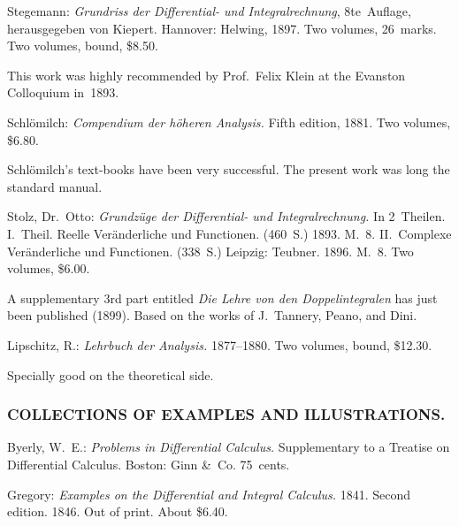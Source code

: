 \documentclass[12pt]{book}[2005/09/16]
\newlength{\ParIndent}
\newenvironment{Book}{\medskip\par\noindent\hangindent\ParIndent\ignorespaces}{\par}
\newenvironment{Descrip}{%
  \begin{list}{}{%
      \setlength{\leftmargin}{1.5\ParIndent}%
      \setlength{\itemindent}{\ParIndent}%
      \setlength{\listparindent}{\ParIndent}%
      \setlength{\topsep}{4pt}%
      \item\small\ignorespaces%
  }%
}{%
\end{list}}
\newcommand{\BibSubsect}[1]{%
  \subsubsection*{\centering\footnotesize\normalfont\MakeUppercase{#1}}
}
\renewcommand{\(}{{\upshape(}}
\renewcommand{\)}{{\upshape)}}
\newcommand{\Title}[1]{\textit{#1}}
\begin{document}
\begin{Book}
Stegemann: \Title{Grundriss der Differential- und Integralrechnung},
8te~Auflage, herausgegeben von Kiepert. Hannover: Helwing,
1897. Two volumes, 26~marks. Two volumes, bound,
\$8.50.

\begin{Descrip}
This work was highly recommended by Prof.\ Felix Klein at the
Evanston Colloquium in~1893.
\end{Descrip}
\end{Book}

\begin{Book}
Schlömilch: \Title{Compendium der höheren Analysis.} Fifth edition,
1881. Two volumes, \$6.80.

\begin{Descrip}
Schlömilch's text-books have been very successful. The present
work was long the standard manual.
\end{Descrip}
\end{Book}

\begin{Book}
Stolz, Dr.\ Otto: \Title{Grundzüge der Differential- und Integralrechnung.}
In 2~Theilen. I.~Theil. Reelle Veränderliche und
Functionen. (460~S.) 1893. M.~8. II.~Complexe Veränderliche
und Functionen. (338~S.) Leipzig: Teubner. 1896.
M.~8. Two volumes, \$6.00.

\begin{Descrip}
A supplementary 3rd part entitled \Title{Die Lehre von den Doppelintegralen}
has just been published (1899). Based on the works of J.~Tannery,
Peano, and Dini.
\end{Descrip}
\end{Book}

\begin{Book}
Lipschitz, R.: \Title{Lehrbuch der Analysis.} 1877--1880. Two volumes,
bound, \$12.30.

\begin{Descrip}
Specially good on the theoretical side.
\end{Descrip}
\end{Book}


\BibSubsect{Collections of Examples and Illustrations.}

\begin{Book}
Byerly, W.~E.: \Title{Problems in Differential Calculus.} Supplementary
to a Treatise on Differential Calculus. Boston: Ginn \&~Co.
75~cents.
\end{Book}

\begin{Book}
Gregory: \Title{Examples on the Differential and Integral Calculus.}
1841. Second edition. 1846. Out of print. About \$6.40.
\end{Book}
\end{document}
